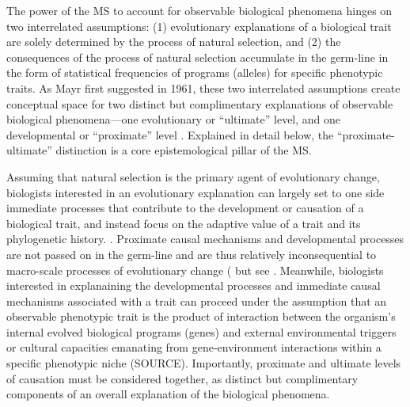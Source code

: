 The power of the MS to account for observable biological phenomena hinges on two interrelated assumptions: (1) evolutionary explanations of a biological trait are solely determined by the process of natural selection, and (2) the consequences of the process of natural selection accumulate in the germ-line in the form of statistical frequencies of programs (alleles) for specific phenotypic traits.  As Mayr first suggested in 1961, these two interrelated assumptions create conceptual space for two distinct but complimentary explanations of observable biological phenomena---one evolutionary or ``ultimate'' level, and one developmental or ``proximate'' level \citep{Mayr1961}.  Explained in detail below, the ``proximate-ultimate'' distinction is a core epistemological pillar of the MS.

Assuming that natural selection is the primary agent of evolutionary change, biologists interested in an evolutionary explanation can largely set to one side immediate processes that contribute to the development or causation of a biological trait, and instead focus on the adaptive value of a trait and its phylogenetic history. \citep{Mayr1961,Tinbergen1963}.  Proximate causal mechanisms and developmental processes are not passed on in the germ-line and are thus relatively inconsequential to macro-scale processes of evolutionary change (\citep{Dawkins1982,Grafen1991,Svensson2017} but see \citep{Laland2013,Laland2015}.  Meanwhile, biologists interested in explanaining the developmental processes and immediate causal mechanisms associated with a trait can proceed under the assumption that an observable phenotypic trait is the product of interaction between the organism's internal evolved biological programs (genes) and external environmental triggers or cultural capacities emanating from gene-environment interactions within a specific phenotypic niche (SOURCE).  Importantly, proximate and ultimate levels of causation must be considered together, as distinct but complimentary components of an overall explanation of the biological phenomena\citep{Mayr1961,Tinbergen1963,Scott-Phillips2011}.

